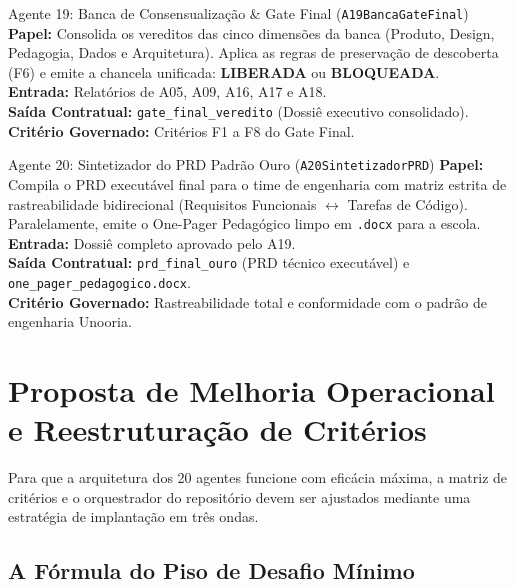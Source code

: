 \documentclass[11pt,a4paper]{article}
\begin{document}
\begin{agentbox}{Agente 19: Banca de Consensualiza\c{c}\~ao \& Gate Final (\texttt{A19BancaGateFinal})}
\textbf{Papel:} Consolida os vereditos das cinco dimens\~oes da banca (Produto, Design, Pedagogia, Dados e Arquitetura). Aplica as regras de preserva\c{c}\~ao de descoberta (F6) e emite a chancela unificada: \textbf{LIBERADA} ou \textbf{BLOQUEADA}.\\
\textbf{Entrada:} Relat\'orios de A05, A09, A16, A17 e A18.\\
\textbf{Sa\'ida Contratual:} \texttt{gate\_final\_veredito} (Dossi\^e executivo consolidado).\\
\textbf{Crit\'erio Governado:} Crit\'erios F1 a F8 do Gate Final.
\end{agentbox}

\begin{agentbox}{Agente 20: Sintetizador do PRD Padr\~ao Ouro (\texttt{A20SintetizadorPRD})}
\textbf{Papel:} Compila o PRD execut\'avel final para o time de engenharia com matriz estrita de rastreabilidade bidirecional (Requisitos Funcionais $\leftrightarrow$ Tarefas de C\'odigo). Paralelamente, emite o One-Pager Pedag\'ogico limpo em \texttt{.docx} para a escola.\\
\textbf{Entrada:} Dossi\^e completo aprovado pelo A19.\\
\textbf{Sa\'ida Contratual:} \texttt{prd\_final\_ouro} (PRD t\'ecnico execut\'avel) e \texttt{one\_pager\_pedagogico.docx}.\\
\textbf{Crit\'erio Governado:} Rastreabilidade total e conformidade com o padr\~ao de engenharia Unooria.
\end{agentbox}

\section{Proposta de Melhoria Operacional e Reestrutura\c{c}\~ao de Crit\'erios}

Para que a arquitetura dos 20 agentes funcione com efic\'acia m\'axima, a matriz de crit\'erios e o orquestrador do reposit\'orio devem ser ajustados mediante uma estrat\'egia de implanta\c{c}\~ao em tr\^es ondas.

\subsection{A F\'ormula do Piso de Desafio M\'inimo}
\end{document}
